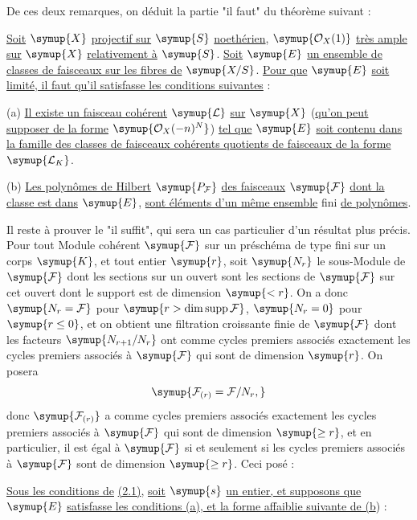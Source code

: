 De ces deux remarques, on déduit la partie "il faut" du théorème suivant :

 \uline{Soit} $\symup{X}$ \uline{projectif sur} $\symup{S}$ \uline{noethérien},
$\symup{\mathcal O_X(1)}$ \uline{très ample sur} $\symup{X}$ \uline{relativement à} $\symup{S}$. \uline{Soit} $\symup{E}$ \uline{un ensemble
de classes de faisceaux sur les fibres de} $\symup{X/S}$. \uline{Pour que} $\symup{E}$ \uline{soit limité, il
faut qu'il
satisfasse les conditions suivantes} :

\medskip
\noindent (a) \uline{Il existe un faisceau cohérent} $\symup{\mathcal L}$ \uline{sur} $\symup{X}$ (\uline{qu'on peut
supposer de la forme} $\symup{\mathcal O_X(-n)^N}$) \uline{tel que} $\symup{E}$ \uline{soit contenu dans la
famille des classes de faisceaux cohérents quotients de faisceaux de la forme}
$\symup{\mathcal L_K}$.

\smallskip
\noindent (b) \uline{Les polynômes de Hilbert} $\symup{P_{\mathcal F}}$ \uline{des faisceaux}
$\symup{\mathcal F}$ \uline{dont la classe est dans} $\symup{E}$, \uline{sont éléments d'un même ensemble} fini
\uline{de polynômes}.

Il reste à prouver le "il suffit", qui sera un cas particulier d'un résultat
plus précis. Pour tout Module cohérent $\symup{\mathcal F}$ sur un préschéma de type
fini sur un corps $\symup{K}$, et tout entier $\symup{r}$, soit $\symup{N_r}$ le sous-Module de
$\symup{\mathcal F}$ dont les sections sur un ouvert sont les sections de $\symup{\mathcal F}$
sur cet ouvert dont le support est de dimension $\symup{<r}$. On a donc
$\symup{N_r=\mathcal F}$ pour $\symup{r>\dim\operatorname{supp}\mathcal F}$, $\symup{N_r=0}$ pour
$\symup{r\leq0}$, et on obtient une filtration croissante finie de $\symup{\mathcal F}$ dont
les facteurs $\symup{N_{r+1}/N_r}$ ont comme cycles premiers associés exactement les cycles premiers
associés à $\symup{\mathcal F}$ qui sont de dimension $\symup{r}$. On posera
\[
\symup{\mathcal F_{(r)}=\mathcal F/N_r,}
\]
donc $\symup{\mathcal F_{(r)}}$ a comme cycles premiers associés exactement les cycles
premiers associés à $\symup{\mathcal F}$ qui sont de dimension $\symup{\geq r}$, et en
particulier, il est égal à $\symup{\mathcal F}$ si et seulement si les cycles premiers
associés à $\symup{\mathcal F}$ sont de dimension $\symup{\geq r}$. Ceci posé :

 \uline{Sous les conditions de} \uline{(2.1)}, \uline{soit} $\symup{s}$ \uline{un entier, et
supposons que} $\symup{E}$ \uline{satisfasse les conditions (a), et la forme affaiblie suivante
de (b}) :

